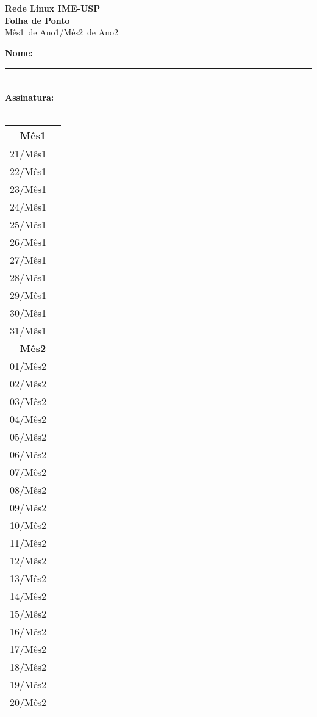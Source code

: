 \documentclass[12pt,a4paper]{article}
\begin{document}
\newcommand{\mesanterior}{Mês1}
\newcommand{\mesatual}{Mês2}
\newcommand{\anoanterior}{Ano1}
\newcommand{\anoatual}{Ano2}

\thispagestyle{empty}
\begin{center}
\Large
\textbf{Rede Linux IME-USP\\Folha de Ponto}
\\
\large
\mesanterior\ de \anoanterior/\mesatual\ de \anoatual


\large
\textbf{Nome:}
\underline{~~~~~~~~~~~~~~~~~~~~~~~~~~~~~~~~~~~~~~~~~~~~~~~~~~~~~~~~~~~~~~~~~~~~~~~~~
}

\textbf{Assinatura:}
\underline{~~~~~~~~~~~~~~~~~~~~~~~~~~~~~~~~~~~~~~~~~~~~~~~~~~~~~~~~~~~~~~~~~~~~}
\end{center}
\normalsize
\begin{center}
\begin{tabular}{|p{3.5cm}|p{9cm}|}
\hline
\multicolumn{2}{|c|}{\textbf{\mesanterior}} \\ \hline
21/\mesanterior &  \\ \hline
22/\mesanterior &  \\ \hline
23/\mesanterior &  \\ \hline
24/\mesanterior &  \\ \hline
25/\mesanterior &  \\ \hline
26/\mesanterior &  \\ \hline
27/\mesanterior &  \\ \hline
28/\mesanterior &  \\ \hline
29/\mesanterior &  \\ \hline
30/\mesanterior &  \\ \hline
31/\mesanterior &  \\ \hline \hline
\multicolumn{2}{|c|}{\textbf{\mesatual}} \\ \hline
01/\mesatual & \\ \hline
02/\mesatual & \\ \hline
03/\mesatual & \\ \hline
04/\mesatual & \\ \hline
05/\mesatual & \\ \hline
06/\mesatual & \\ \hline
07/\mesatual & \\ \hline
08/\mesatual & \\ \hline
09/\mesatual & \\ \hline
10/\mesatual &  \\ \hline
11/\mesatual &  \\ \hline
12/\mesatual &  \\ \hline
13/\mesatual &  \\ \hline
14/\mesatual &  \\ \hline
15/\mesatual &  \\ \hline
16/\mesatual &  \\ \hline
17/\mesatual &  \\ \hline
18/\mesatual &  \\ \hline
19/\mesatual &  \\ \hline
20/\mesatual &  \\ \hline
\end{tabular}
\end{center}
\end{document}
